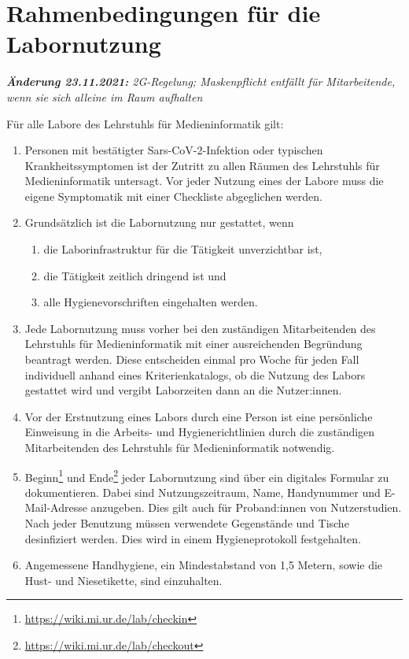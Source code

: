 \section{Rahmenbedingungen für die Labornutzung}\label{sec:allgemein}

\noindent
\emph{\textbf{Änderung 23.11.2021:} 2G-Regelung; Maskenpflicht entfällt für Mitarbeitende, wenn sie sich alleine im Raum aufhalten}
\medskip

\noindent
Für alle Labore des Lehrstuhls für Medieninformatik gilt:

\begin{enumerate}
    \item{Personen mit bestätigter Sars-CoV-2-Infektion oder typischen Krankheitssymptomen ist der Zutritt zu allen Räumen des Lehrstuhls für Medieninformatik untersagt. Vor jeder Nutzung eines der Labore muss die eigene Symptomatik mit einer Checkliste abgeglichen werden.}
    \item Grundsätzlich ist die Labornutzung nur gestattet, wenn
    \begin{enumerate}
        \item die Laborinfrastruktur für die Tätigkeit unverzichtbar ist,
        \item die Tätigkeit zeitlich dringend ist und 
        \item alle Hygienevorschriften eingehalten werden.
    \end{enumerate}
    \item{Jede Labornutzung muss vorher bei den zuständigen Mitarbeitenden des Lehrstuhls für Medieninformatik mit einer ausreichenden Begründung beantragt werden. Diese entscheiden einmal pro Woche für jeden Fall individuell anhand eines Kriterienkatalogs, ob die Nutzung des Labors gestattet wird und vergibt Laborzeiten dann an die Nutzer:innen.}
    \item{Vor der Erstnutzung eines Labors durch eine Person ist eine persönliche Einweisung in die Arbeits- und Hygienerichtlinien durch die zuständigen Mitarbeitenden des Lehrstuhls für Medieninformatik notwendig.}
    \item{Beginn\footnote{\url{https://wiki.mi.ur.de/lab/checkin}} und Ende\footnote{\url{https://wiki.mi.ur.de/lab/checkout}} jeder Labornutzung sind über ein digitales Formular zu dokumentieren.
    Dabei sind Nutzungszeitraum, Name, Handynummer und E-Mail-Adresse anzugeben.
    Dies gilt auch für Proband:innen von Nutzerstudien.
    Nach jeder Benutzung müssen verwendete Gegenstände und Tische desinfiziert werden.
    Dies wird in einem Hygieneprotokoll festgehalten.}
    \item{Angemessene Handhygiene, ein Mindestabstand von 1,5 Metern, sowie die Hust- und Niesetikette, sind einzuhalten.

}
\end{enumerate}
